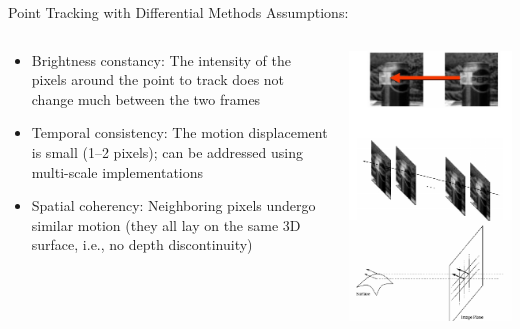 \begin{frame}{Point Tracking with Differential Methods}
  Assumptions:

  \begin{columns}
    \begin{column}{0.7\textwidth}
      \begin{itemize}
        \item Brightness constancy: The intensity of the pixels around the point to track does not change much between the two frames
        \item Temporal consistency: The motion displacement is small (1–2 pixels); can be addressed using multi-scale implementations
        \item Spatial coherency: Neighboring pixels undergo similar motion (they all lay on the same 3D surface, i.e., no depth discontinuity)
    \end{itemize}
    \end{column}
    \begin{column}{0.3\textwidth}  %
      \begin{center}
      \includegraphics[width=0.7\columnwidth]{./images/optical_flow/point_tracking_differential_methods_properties.pdf}
      \end{center}
    \end{column}
  \end{columns}

\end{frame}

